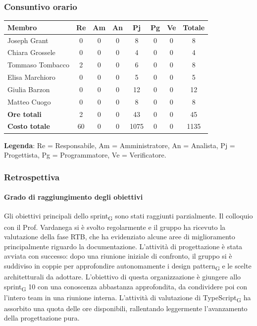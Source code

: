 \documentclass[11pt,a4paper]{article}
\newcommand{\gls}[1]{#1\textsubscript{G}}
\begin{document}
\subsubsection{Consuntivo orario}
\begin{center}
    \begin{tabular}{|l|c|c|c|c|c|c|c|}
        \hline
        \textbf{Membro} & \textbf{Re} & \textbf{Am} & \textbf{An} & \textbf{Pj} & \textbf{Pg} & \textbf{Ve} & \textbf{Totale} \\
        \hline
        Joseph Grant & 0 & 0 & 0 & 8 & 0 & 0 & 8 \\
        \hline
        Chiara Grossele & 0 & 0 & 0 & 4 & 0 & 0 & 4 \\
        \hline
        Tommaso Tombacco & 2 & 0 & 0 & 6 & 0 & 0 & 8 \\
        \hline
        Elisa Marchioro & 0 & 0 & 0 & 5 & 0 & 0 & 5 \\
        \hline
        Giulia Barzon & 0 & 0 & 0 & 12 & 0 & 0 & 12 \\
        \hline
        Matteo Cuogo & 0 & 0 & 0 & 8 & 0 & 0 & 8 \\
        \hline
        \textbf{Ore totali} & 2 & 0 & 0 & 43 & 0 & 0 & 45 \\
        \hline
        \textbf{Costo totale} & 60 & 0 & 0 & 1075 & 0 & 0 & 1135 \\
        \hline
    \end{tabular}
\end{center}

\noindent \textbf{Legenda}: Re = Responsabile, Am = Amministratore, An = Analista, Pj = Progettista, Pg = Programmatore, Ve = Verificatore.

\subsubsection{Retrospettiva}
\paragraph{Grado di raggiungimento degli obiettivi}
Gli obiettivi principali dello \gls{sprint} sono stati raggiunti parzialmente. Il colloquio con il Prof. Vardanega si è svolto regolarmente e il gruppo ha ricevuto la valutazione della fase RTB, che ha evidenziato alcune aree di miglioramento principalmente riguardo la documentazione. L'attività di progettazione è stata avviata con successo: dopo una riunione iniziale di confronto, il gruppo si è suddiviso in coppie per approfondire autonomamente i \gls{design pattern} e le scelte architetturali da adottare. L'obiettivo di questa organizzazione è giungere allo \gls{sprint} 10 con una conoscenza abbastanza approfondita, da condividere poi con l'intero team in una riunione interna. L'attività di valutazione di \gls{TypeScript} ha assorbito una quota delle ore disponibili, rallentando leggermente l'avanzamento della progettazione pura.
 
\end{document}

